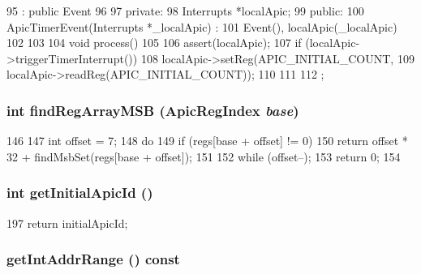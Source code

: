 \begin{DoxyCode}
95                          : public Event
96     {
97       private:
98         Interrupts *localApic;
99       public:
100         ApicTimerEvent(Interrupts *_localApic) :
101             Event(), localApic(_localApic)
102         {}
103 
104         void process()
105         {
106             assert(localApic);
107             if (localApic->triggerTimerInterrupt()) {
108                 localApic->setReg(APIC_INITIAL_COUNT,
109                         localApic->readReg(APIC_INITIAL_COUNT));
110             }
111         }
112     };
\end{DoxyCode}
\hypertarget{classX86ISA_1_1Interrupts_a8d15a5b6dddd42176d18d4952a9c8713}{
\subsubsection[{findRegArrayMSB}]{\setlength{\rightskip}{0pt plus 5cm}int findRegArrayMSB ({\bf ApicRegIndex} {\em base})}}
\label{classX86ISA_1_1Interrupts_a8d15a5b6dddd42176d18d4952a9c8713}



\begin{DoxyCode}
146     {
147         int offset = 7;
148         do {
149             if (regs[base + offset] != 0) {
150                 return offset * 32 + findMsbSet(regs[base + offset]);
151             }
152         } while (offset--);
153         return 0;
154     }
\end{DoxyCode}
\hypertarget{classX86ISA_1_1Interrupts_a91c9a4205f98f4fe9cef39ae0641002b}{
\subsubsection[{getInitialApicId}]{\setlength{\rightskip}{0pt plus 5cm}int getInitialApicId ()}}
\label{classX86ISA_1_1Interrupts_a91c9a4205f98f4fe9cef39ae0641002b}



\begin{DoxyCode}
197 { return initialApicId; }
\end{DoxyCode}
\hypertarget{classX86ISA_1_1Interrupts_ad86b339471781a0d7634d3c41c6a1c87}{
\subsubsection[{getIntAddrRange}]{ getIntAddrRange () const}}
\label{classX86ISA_1_1Interrupts_ad86b339471781a0d7634d3c41c6a1c87}


